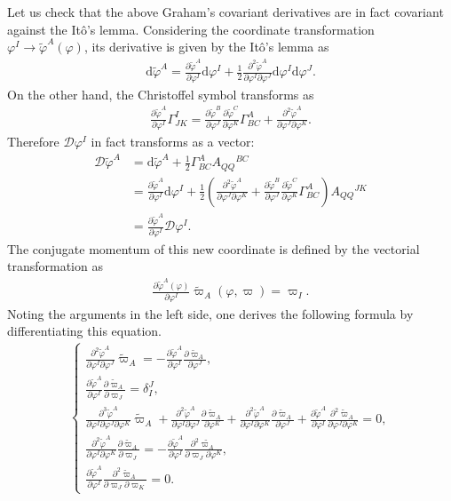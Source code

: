 \documentclass[aps, prd
, preprint
, nofootinbib 
, notitlepage
, longbibliography
]{revtex4-1}
\newcommand{\pdif}[2]{\frac{\partial #1}{\partial #2}}
\newcommand{\ppdpdpd}[3]{\frac{\partial^2 #1}{\partial #2\partial #3}}
\newcommand{\pppdpdpdpd}[4]{\frac{\partial^3 #1}{\partial #2\partial #3\partial #4}}
\newcommand{\dd}{\mathrm{d}}
\newcommand{\dps}{\displaystyle}
\newcommand{\calD}{\mathcal{D}}
\newcommand{\bae}[1]{\begin{align} #1 \end{align}}
\newcommand{\bce}[1]{\begin{cases} #1 \end{cases}}
\begin{document}
Let us check that the above Graham's covariant derivatives are in fact covariant against the It\^o's lemma.
Considering the coordinate transformation $\varphi^I\to\tilde{\varphi}^A(\varphi)$, its derivative is given by the It\^o's lemma as
\bae{
	\dd\tilde{\varphi}^A=\pdif{\tilde{\varphi}^A}{\varphi^I}\dd\varphi^I+\frac{1}{2}\frac{\partial^2\tilde{\varphi}^A}{\partial\varphi^I\partial\varphi^J}\dd\varphi^I\dd\varphi^J.
}
On the other hand, the Christoffel symbol transforms as
\bae{\label{eq: christoffel trs.}
	\pdif{\tilde{\varphi}^A}{\varphi^I}\Gamma^I_{JK}=\pdif{\tilde{\varphi}^B}{\varphi^J}\pdif{\tilde{\varphi}^C}{\varphi^K}\Gamma^A_{BC}
	+\frac{\partial^2\tilde{\varphi}^A}{\partial\varphi^J\partial\varphi^K}.
}
Therefore $\calD\varphi^I$ in fact transforms as a vector:
\bae{
	\calD\tilde{\varphi}^A&=\dd\tilde{\varphi}^A+\frac{1}{2}\Gamma^A_{BC}A_{QQ}{}^{BC} \nonumber \\
	&=\pdif{\tilde{\varphi}^A}{\varphi^I}\dd\varphi^I+\frac{1}{2}\left(\frac{\partial^2\tilde{\varphi}^A}{\partial\varphi^J\partial\varphi^K}
	+\pdif{\tilde{\varphi}^B}{\varphi^J}\pdif{\tilde{\varphi}^C}{\varphi^K}\Gamma^A_{BC}\right)A_{QQ}{}^{JK} \nonumber \\
	&=\pdif{\tilde{\varphi}^A}{\varphi^I}\calD\varphi^I.
}
The conjugate momentum of this new coordinate is defined by the vectorial transformation as
\bae{
	\pdif{\tilde{\varphi}^A(\varphi)}{\varphi^I}\tilde{\varpi}_A(\varphi,\varpi)=\varpi_I.
}
Noting the arguments in the left side, one derives the following formula by differentiating this equation.
\bae{
	\bce{
		\dps
		\ppdpdpd{\tilde{\varphi}^A}{\varphi^I}{\varphi^J}\tilde{\varpi}_A=-\pdif{\tilde{\varphi}^A}{\varphi^I}\pdif{\tilde{\varpi}_A}{\varphi^J}, \\[10pt]
		\dps
		\pdif{\tilde{\varphi}^A}{\varphi^I}\pdif{\tilde{\varpi}_A}{\varpi_J}=\delta^J_I, \\[10pt]
		\dps
		\pppdpdpdpd{\tilde{\varphi}^A}{\varphi^I}{\varphi^J}{\varphi^K}\tilde{\varpi}_A+\ppdpdpd{\tilde{\varphi}^A}{\varphi^I}{\varphi^J}\pdif{\tilde{\varpi}_A}{\varphi^K}
		+\ppdpdpd{\tilde{\varphi}^A}{\varphi^I}{\varphi^K}\pdif{\tilde{\varpi}_A}{\varphi^J}+\pdif{\tilde{\varphi}^A}{\varphi^I}\ppdpdpd{\tilde{\varpi}_A}{\varphi^J}{\varphi^K}=0, \\[10pt]
		\dps
		\ppdpdpd{\tilde{\varphi}^A}{\varphi^I}{\varphi^K}\pdif{\tilde{\varpi}_A}{\varpi_J}=-\pdif{\tilde{\varphi}^A}{\varphi^I}\ppdpdpd{\tilde{\varpi_A}}{\varpi_J}{\varphi^K}, \\[10pt]
		\dps
		\pdif{\tilde{\varphi}^A}{\varphi^I}\ppdpdpd{\tilde{\varpi}_A}{\varpi_J}{\varpi_K}=0.
	}
}
\end{document}
